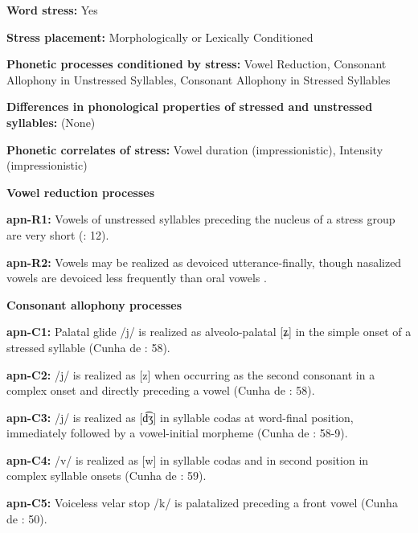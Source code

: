 \textbf{Word stress:} Yes



\textbf{Stress placement:} Morphologically or Lexically Conditioned



\textbf{Phonetic processes conditioned by stress:} Vowel Reduction, Consonant Allophony in Unstressed Syllables, Consonant Allophony in Stressed Syllables



\textbf{Differences in phonological properties of stressed and unstressed syllables:} (None)



\textbf{Phonetic correlates of stress:} Vowel duration (impressionistic), Intensity (impressionistic)



\textbf{Vowel reduction processes}



\textbf{apn-R1:} Vowels of unstressed syllables preceding the nucleus of a stress group are very short (\citealt{BurgessHam1968}: 12).



\textbf{apn-R2:} Vowels may be realized as devoiced utterance-finally, though nasalized vowels are devoiced less frequently than oral vowels \citep[7]{Ham2009}.



\textbf{Consonant allophony processes}



\textbf{apn-C1:} Palatal glide /j/ is realized as alveolo-palatal [ʑ] in the simple onset of a stressed syllable (Cunha de \citealt{Oliveira2005}: 58).



\textbf{apn-C2:} /j/ is realized as [z] when occurring as the second consonant in a complex onset and directly preceding a vowel (Cunha de \citealt{Oliveira2005}: 58).



\textbf{apn-C3:} /j/ is realized as [d͡ʒ] in syllable codas at word-final position, immediately followed by a vowel-initial morpheme (Cunha de \citealt{Oliveira2005}: 58-9).



\textbf{apn-C4:} /v/ is realized as [w] in syllable codas and in second position in complex syllable onsets (Cunha de \citealt{Oliveira2005}: 59).



\textbf{apn-C5:} Voiceless velar stop /k/ is palatalized preceding a front vowel (Cunha de \citealt{Oliveira2005}: 50).



